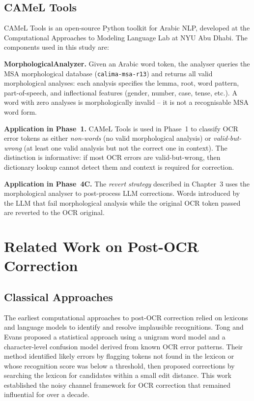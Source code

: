 \subsection{CAMeL Tools}
\label{subsec:ks_camel}

CAMeL Tools \cite{obeid2020camel} is an open-source Python toolkit for Arabic
NLP, developed at the Computational Approaches to Modeling Language Lab at
NYU Abu Dhabi.
The components used in this study are:

\textbf{MorphologicalAnalyzer.}
Given an Arabic word token, the analyser queries the MSA morphological database
(\texttt{calima-msa-r13}) and returns all valid morphological analyses:
each analysis specifies the lemma, root, word pattern, part-of-speech, and
inflectional features (gender, number, case, tense, etc.).
A word with zero analyses is morphologically invalid -- it is not a recognisable
MSA word form.

\textbf{Application in Phase~1.}
CAMeL Tools is used in Phase~1 to classify OCR error tokens as either
\emph{non-words} (no valid morphological analysis) or \emph{valid-but-wrong}
(at least one valid analysis but not the correct one in context).
The distinction is informative: if most OCR errors are valid-but-wrong, then
dictionary lookup cannot detect them and context is required for correction.

\textbf{Application in Phase~4C.}
The \emph{revert strategy} described in Chapter~3 uses the morphological analyser
to post-process LLM corrections.
Words introduced by the LLM that fail morphological analysis while the original
OCR token passed are reverted to the OCR original.

\section{Related Work on Post-OCR Correction}
\label{sec:related}

\subsection{Classical Approaches}
\label{subsec:related_classical}

The earliest computational approaches to post-OCR correction relied on lexicons
and language models to identify and resolve implausible recognitions.
Tong and Evans \cite{tong1996statistical} proposed a statistical approach using
a unigram word model and a character-level confusion model derived from known
OCR error patterns.
Their method identified likely errors by flagging tokens not found in the lexicon
or whose recognition score was below a threshold, then proposed corrections by
searching the lexicon for candidates within a small edit distance.
This work established the noisy channel framework for OCR correction that
remained influential for over a decade.

